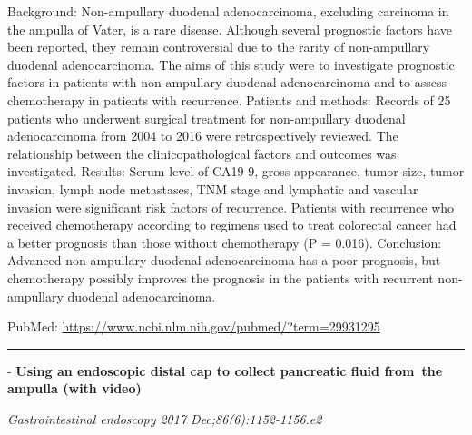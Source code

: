 \documentclass[]{article}
\begin{document}
Background: Non-ampullary duodenal adenocarcinoma, excluding carcinoma
in the ampulla of Vater, is a rare disease. Although several prognostic
factors have been reported, they remain controversial due to the rarity
of non-ampullary duodenal adenocarcinoma. The aims of this study were to
investigate prognostic factors in patients with non-ampullary duodenal
adenocarcinoma and to assess chemotherapy in patients with recurrence.
Patients and methods: Records of 25 patients who underwent surgical
treatment for non-ampullary duodenal adenocarcinoma from 2004 to 2016
were retrospectively reviewed. The relationship between the
clinicopathological factors and outcomes was investigated. Results:
Serum level of CA19-9, gross appearance, tumor size, tumor invasion,
lymph node metastases, TNM stage and lymphatic and vascular invasion
were significant risk factors of recurrence. Patients with recurrence
who received chemotherapy according to regimens used to treat colorectal
cancer had a better prognosis than those without chemotherapy (P =
0.016). Conclusion: Advanced non-ampullary duodenal adenocarcinoma has a
poor prognosis, but chemotherapy possibly improves the prognosis in the
patients with recurrent non-ampullary duodenal adenocarcinoma.

PubMed: \url{https://www.ncbi.nlm.nih.gov/pubmed/?term=29931295}

{}

{}

\begin{center}\rule{0.5\linewidth}{\linethickness}\end{center}

 - \textbf{Using an endoscopic distal cap to collect pancreatic fluid
from~the ampulla (with video)}

\emph{Gastrointestinal endoscopy 2017 Dec;86(6):1152-1156.e2}
\end{document}
